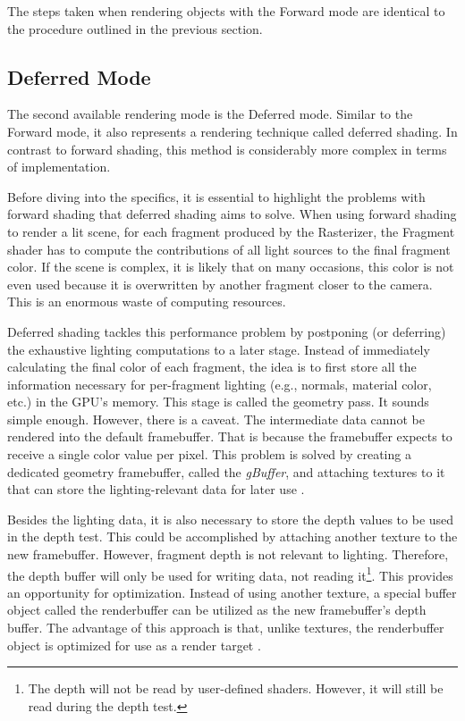 \documentclass[
  digital,     %
  oneside,     %
  nosansbold,  %
  nocolorbold, %
  lof,         %
  lot,         %
]{fithesis4}
\begin{document}
The steps taken when rendering objects with the Forward mode are identical to the procedure outlined
in the previous section.

\subsection{Deferred Mode}
The second available rendering mode is the Deferred mode. Similar to the Forward mode, it also represents
a rendering technique called deferred shading. In contrast to forward shading, this method is considerably
more complex in terms of implementation.

Before diving into the specifics, it is essential to highlight the problems with forward shading
that deferred shading aims to solve. When using forward shading to render a lit scene,
for each fragment produced by the Rasterizer, the Fragment shader has to compute the contributions
of all light sources to the final fragment color. If the scene is complex, it is likely that on many occasions,
this color is not even used because it is overwritten by another fragment closer to the camera.
This is an enormous waste of computing resources.

Deferred shading tackles this performance problem by postponing (or deferring) the exhaustive lighting computations to a later stage.
Instead of immediately calculating the final color of each fragment,
the idea is to first store all the information necessary for per-fragment lighting
(e.g., normals, material color, etc.) in the GPU's memory. This stage is called the geometry pass. It sounds
simple enough. However, there is a caveat. The intermediate data cannot be rendered into the default framebuffer.
That is because the framebuffer expects to receive a single color value per pixel.
This problem is solved by creating a dedicated geometry framebuffer, called the \emph{gBuffer}, and attaching textures to it
that can store the lighting-relevant data for later use \cite{learnopengl-deferred}.

Besides the lighting data, it is also necessary
to store the depth values to be used in the depth test. This could be accomplished by attaching another texture
to the new framebuffer. However, fragment depth is not relevant to lighting.
Therefore, the depth buffer will only be used for writing data, not reading it\footnote{The depth will not be read by user-defined shaders.
However, it will still be read during the depth test.}. This provides an opportunity for optimization.
Instead of using another texture, a special buffer object called the renderbuffer can be utilized as the new
framebuffer's depth buffer. The advantage of this approach is that, unlike textures, the renderbuffer object is optimized for
use as a render target \cite[p.526-540]{opengl-book} \cite{openglwiki-rbo}.
\end{document}
